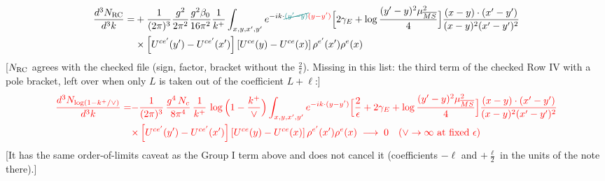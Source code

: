 \documentclass[9pt]{article}
\numberwithin{equation}{section}
\begin{document}
\begin{align}
\frac{d^{3}N_{\rm RC}}{d^{3}k}= & +\frac{1}{(2\pi)^{3}}\frac{g^{2}}{2\pi^{2}}\frac{g^{2}\beta_{0}}{16\pi^{2}}\frac{1}{k^{+}}\int_{x,y,x',y'}e^{-ik\cdot{\color{teal}\cancel{(y'-y)}}{\color{red}(y-y')}}\Big[2\gamma_{E}+\log\frac{(y'-y)^{2}\mu^{2}_{\overline{MS}}}{4}\Big]\frac{(x-y)\cdot(x'-y')}{(x-y)^{2}(x'-y')^{2}}\notag\\
&\times\left[U^{ce'}(y') - U^{ce'}(x')\right]\left[U^{ce}(y) - U^{ce}(x)\right]\rho^{e'}(x')\rho^{e}(x)
\end{align} {\color{red}[$N_{\rm RC}$ agrees with the checked file (sign, factor, bracket without the $\frac{2}{\epsilon}$). Missing in this list: the third term of the checked Row IV with a pole bracket, left over when only $L$ is taken out of the coefficient $L+\ell$:]} \begin{align} {\color{red}\frac{d^{3}N_{\log(1-k^{+}/\vee)}}{d^{3}k}=} & {\color{red}-\frac{1}{(2\pi)^{3}}\,\frac{g^{4}\,N_{c}}{8\pi^{4}}\,\frac{1}{k^{+}}\,\log\Big(1-\frac{k^{+}}{\vee}\Big)\int_{x,y,x',y'}e^{-ik\cdot(y-y')}\Big[\frac{2}{\epsilon}+2\gamma_{E}+\log\frac{(y'-y)^{2}\mu^{2}_{\overline{MS}}}{4}\Big]\frac{(x-y)\cdot(x'-y')}{(x-y)^{2}(x'-y')^{2}}}\notag \\ & {\color{red}\times\left[U^{ce'}(y') - U^{ce'}(x')\right]\left[U^{ce}(y) - U^{ce}(x)\right]\rho^{e'}(x')\rho^{e}(x)\;\longrightarrow\;0\quad(\vee\to\infty\ \text{at fixed }\epsilon)} \end{align} {\color{red}[It has the same order-of-limits caveat as the Group I term above and does not cancel it (coefficients $-\ell$ and $+\frac{\ell}{2}$ in the units of the note there).]}\par\noindent
\end{document}
